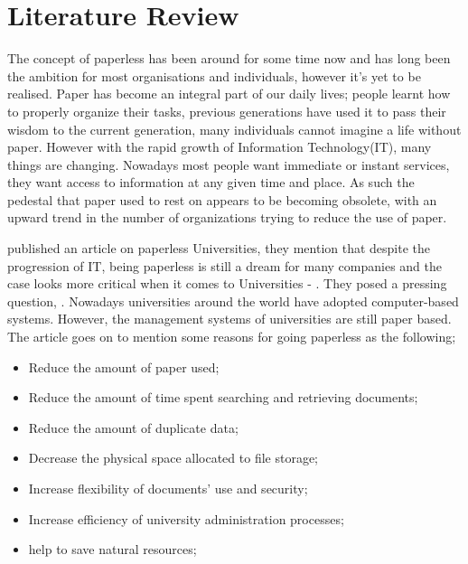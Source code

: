 
\chapter{Literature Review}
\label{chap:litReview}
The concept of paperless has been around for some time now and has long been the ambition for most organisations and individuals, however it's yet to be realised. Paper has become an integral part of our daily lives; people learnt how to properly organize their tasks, previous generations have used it to pass their wisdom to the current generation, many individuals cannot imagine a life without paper. 
However with the rapid growth of Information Technology(IT), many things are changing. Nowadays most people want immediate or instant services, they want access to information at any given time and place. As such the pedestal that paper used to rest on appears to be becoming obsolete, with an upward trend in the number of organizations trying to reduce the use of paper.

\cite{7760717} published an article on paperless Universities, they mention that despite the progression of IT, being paperless is still a dream for many companies and the case looks more critical when it comes to Universities - .
They posed a pressing question, . Nowadays universities around the world have adopted computer-based systems. However, the management systems of universities are still paper based. The article goes on to mention some reasons for going paperless as the following;
\begin{itemize}
	\item Reduce the amount of paper used;
	\item Reduce the amount of time spent searching and retrieving documents;
	\item Reduce the amount of duplicate data;
	\item Decrease the physical space allocated to file storage;
	\item Increase flexibility of documents' use and security;
	\item Increase efficiency of university administration processes;
		\item help to save natural resources;
\end{itemize}

